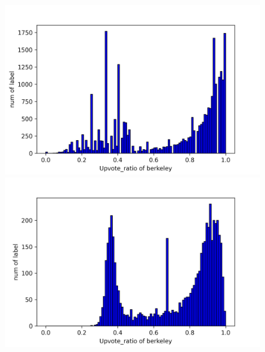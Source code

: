 \documentclass[11pt,a4paper]{article}
\begin{document}
    \begin{figure}
        \begin{minipage}{0.5\textwidth}
            \includegraphics[width=\textwidth]{berkeley_task2true_nonsmooth.png}
        \end{minipage}
        \begin{minipage}{0.5\textwidth}
            \includegraphics[width=\textwidth]{berkeley_task2pred_nonsmooth.png}
        \end{minipage}


\end{figure}
\end{document}

